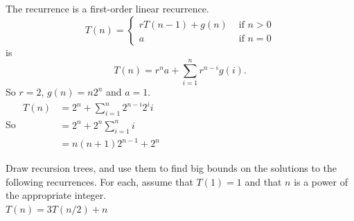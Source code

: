 \documentclass[a4paper, justified]{tufte-handout}
\begin{document}
\begin{solution}
  The recurrence is a first-order linear recurrence.
  $$
    T(n)= \begin{cases}r T(n-1)+g(n) & \text { if } n>0 \\ a & \text { if } n=0\end{cases}
  $$
  is $$T(n) = r^na + \sum^n_{i = 1}r^{n-i}g(i).$$
  So $r = 2$, $g(n) = n2^n$ and $a = 1$.\\
  So $\begin{aligned}
      T(n) & =2^{n}+\sum_{i=1}^{n} 2^{n-i} 2^{i} i \\ &
      =2^{n}+2^{n} \sum_{i=1}^{n} i                \\ &
      =n(n+1) 2^{n-1}+2^{n}
    \end{aligned}$

\end{solution}

\begin{problem}[CS 4.3-9(c)]
Draw recursion trees, and use them to find big bounds on the solutions to the following recurrences. For each, assume that $T(1) = 1$ and that $n$ is a power of the appropriate integer.\\
$T(n) = 3T(n/2) + n$\\
\end{problem}
\end{document}

